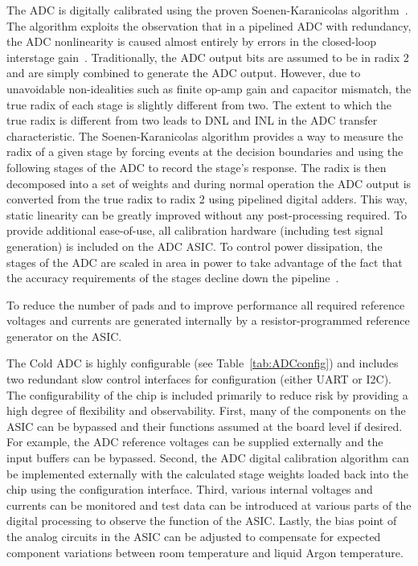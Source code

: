 The ADC is digitally calibrated using the proven Soenen-Karanicolas algorithm~\cite{280084,372864}. The algorithm exploits the observation that in a pipelined ADC with redundancy, the ADC nonlinearity is caused almost entirely by errors in the closed-loop interstage gain~\cite{121557}. Traditionally, the ADC output bits are assumed to be in radix 2 and are simply combined to generate the ADC output. However, due to unavoidable non-idealities such as finite op-amp gain and capacitor mismatch, the true radix of each stage is slightly different from two. The extent to which the true radix is different from two leads to DNL and INL in the ADC transfer characteristic. The Soenen-Karanicolas algorithm provides a way to measure the radix of a given stage by forcing events at the decision boundaries and using the following stages of the ADC to record the stage’s response. The radix is then decomposed into a set of weights and during normal operation the ADC output is converted from the true radix to radix 2 using pipelined digital adders. This way, static linearity can be greatly improved without any post-processing required. To provide additional ease-of-use, all calibration hardware (including test signal generation) is included on the ADC ASIC. To control power dissipation, the stages of the ADC are scaled in area in power to take advantage of the fact that the accuracy requirements of the stages decline down the pipeline~\cite{494191}.

To reduce the number of pads and to improve performance all required reference voltages and currents are generated internally by a resistor-programmed reference generator on the ASIC.

The Cold ADC is highly configurable (see Table~\ref{tab:ADCconfig}) and includes two redundant slow control interfaces for configuration (either UART or I2C). The configurability of the chip is included primarily to reduce risk by providing a high degree of flexibility and observability. First, many of the components on the ASIC can be bypassed and their functions assumed at the board level if desired. For example, the ADC reference voltages can be supplied externally and the input buffers can be bypassed. Second, the ADC digital calibration algorithm can be implemented externally with the calculated stage weights loaded back into the chip using the configuration interface. Third, various internal voltages and currents can be monitored and test data can be introduced at various parts of the digital processing to observe the function of the ASIC. Lastly, the bias point of the analog circuits in the ASIC can be adjusted to compensate for expected component variations between room temperature and liquid Argon temperature.

